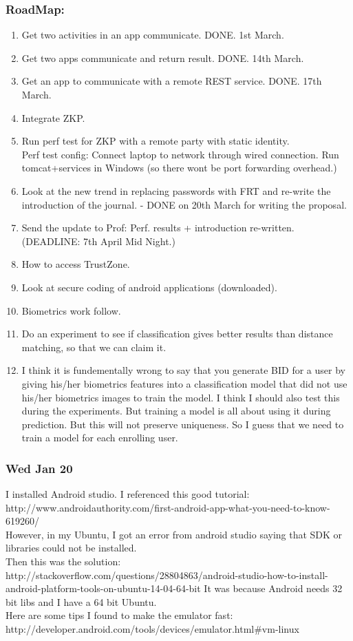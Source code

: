 \documentclass[11pt]{article}
\begin{document}
\subsubsection*{RoadMap:}
\begin{enumerate}
 \item Get two activities in an app communicate. DONE. 1st March.
 \item Get two apps communicate and return result. DONE. 14th March.
 \item Get an app to communicate with a remote REST service. DONE. 17th March.
 \item Integrate ZKP.
 \item Run perf test for ZKP with a remote party with static identity.\\
 Perf test config: Connect laptop to network through wired connection. Run tomcat+services in Windows (so there wont be port forwarding overhead.)
 \item Look at the new trend in replacing passwords with FRT and re-write the introduction of the journal. - DONE on 20th March for writing the 
proposal.
 \item Send the update to Prof: Perf. results + introduction re-written. (DEADLINE: 7th April Mid Night.)
 \item How to access TrustZone.
 \item Look at secure coding of android applications (downloaded).
 \item Biometrics work follow.
 \item
  Do an experiment to see if classification gives better results than distance matching, so that we can claim it.
 \item I think it is fundementally wrong to say that you generate BID for a user by giving his/her biometrics features into a classification model 
that   did not use his/her biometrics images to train the model. I think I should also test this during the experiments. But training a model is all 
about using it during prediction. But this will not preserve uniqueness. So I guess that we need to train a model for each enrolling user.
\end{enumerate}

\subsubsection*{Wed Jan 20}
I installed Android studio. I referenced this good tutorial: http://www.androidauthority.com/first-android-app-what-you-need-to-know-619260/\\
However, in my Ubuntu, I got an error from android studio saying that SDK or libraries could not be installed. \\
Then this was the solution: http://stackoverflow.com/questions/28804863/android-studio-how-to-install-android-platform-tools-on-ubuntu-14-04-64-bit
It was because Android needs 32 bit libs and I have a 64 bit Ubuntu.\\
Here are some tips I found to make the emulator fast:
http://developer.android.com/tools/devices/emulator.html\#vm-linux
\end{document}
